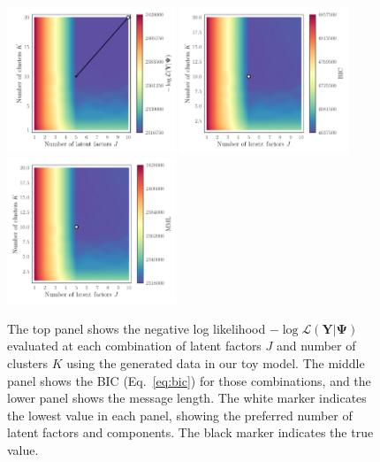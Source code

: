 \documentclass[twocolumn]{aastex62}
\newcommand{\vect}[1]{\boldsymbol{\mathbf{#1}}}
\renewcommand{\vec}[1]{\vect{#1}}
\newcommand{\weight}{\pi}
\newcommand{\data}{\textbf{Y}}
\newcommand{\NumLatentFactors}{J}
\newcommand{\NumComponents}{K}
\newcommand{\likelihood}{\mathcal{L}}
\begin{document}
 

\begin{figure}
	\includegraphics[width=0.45\textwidth]{experiments/exp1-gridsearch-ll-contours.pdf}
	\includegraphics[width=0.45\textwidth]{experiments/exp1-gridsearch-bic-contours.pdf}
	\includegraphics[width=0.45\textwidth]{experiments/exp1-gridsearch-mml-contours.pdf}
    \caption{The top panel shows the negative log likelihood 
			 $-\log{\mathcal{L}\left(\data|\vec\Psi\right)}$ 
			 evaluated at each combination of latent factors 
			 $\NumLatentFactors$ and number of clusters 
			 $\NumComponents$ using the generated data in our toy model.
			 The middle panel shows 
			 the BIC (Eq.~\ref{eq:bic}) for those 
			 combinations, and the lower panel shows the 
			 message length. The white marker indicates the
			 lowest value in each panel, showing the
			 preferred number of latent factors and components.
			 The black marker indicates the true value.}
    \label{fig:experiment-1-gridsearch}
\end{figure}
\end{document}
